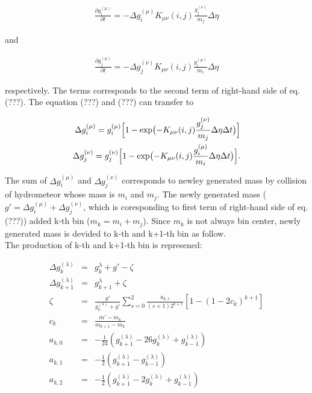 \begin{eqnarray}
\frac{\partial g_{i}^{(\mu)}}{\partial t}=-\Delta g^{(\mu)}_{i} K_{\mu\nu}(i,j)\frac{g_{j}^{(\nu)}}{m_{j}}\Delta \eta
\end{eqnarray}

and


\begin{eqnarray}
\frac{\partial g_{j}^{(\mu)}}{\partial t}=-\Delta g^{(\nu)}_{j}K_{\mu\nu}(i,j)\frac{g_{i}^{(\mu)}}{m_{i}}\Delta \eta
\end{eqnarray}

respectively. The terms corresponds to the second term of right-hand side of eq.(???). The equation (???) and (???) can transfer to

\begin{eqnarray}
\Delta g_{i}^{(\mu)}=g_{i}^{(\mu)}\Bigl [1-\exp\bigl(-K_{\mu\nu}(i,j)\frac{g^{(\nu)}_{j}}{m_{j}}\Delta \eta\Delta t\bigr) \Bigl]\\
\Delta g_{j}^{(\nu)}=g_{j}^{(\nu)}\Bigl [1-\exp\bigl(-K_{\mu\nu}(i,j)\frac{g^{(\mu)}_{i}}{m_{i}}\Delta \eta\Delta t\bigr) \Bigl].
\end{eqnarray}

The sum of $\Delta g_{i}^{(\mu)}$ and $\Delta g_{j}^{(\nu)}$ corresponds to newley generated mass by collision of hydrometeor whose mass is $m_{i}$ and $m_{j}$. The newly generated mass ($g'=\Delta g_{i}^{(\mu)}+\Delta g_{j}^{(\nu)}$, which is coresponding to first term of right-hand side of eq.(???)) added k-th bin ($m_{k}=m_{i}+m_{j}$). Since $m_{k}$ is not always bin center, newly generated mass is devided to k-th and k+1-th bin as follow.\\
The production of k-th and k+1-th bin is represened:

\begin{eqnarray}
\Delta g_{k}^{(\lambda)}&=&g_{k}^{\lambda}+g'-\zeta\\
\Delta g_{k+1}^{(\lambda)}&=&g_{k+1}^{\lambda}+\zeta\\
\zeta&=&\frac{g'}{g_{k}^{(\lambda)}+g'}\sum_{s=0}^{2}\frac{a_{k,s}}{(s+1)2^{k+1}}[1-(1-2c_{k})^{k+1}]\nonumber\\
c_{k}&=&\frac{m'-m_{k}}{m_{k+1}-m_{k}}\nonumber\\
a_{k,0}&=&-\frac{1}{24}(g_{k+1}^{(\lambda)}-26g_{k}^{(\lambda)}+g_{k-1}^{(\lambda)})\nonumber\\
a_{k,1}&=&-\frac{1}{2}(g_{k+1}^{(\lambda)}-g_{k-1}^{(\lambda)})\nonumber\\
a_{k,2}&=&-\frac{1}{2}(g_{k+1}^{(\lambda)}-2g_{k}^{(\lambda)}+g_{k-1}^{(\lambda)})\nonumber
\end{eqnarray}

